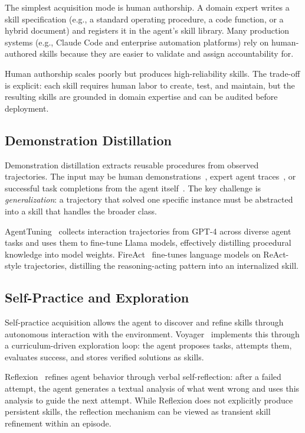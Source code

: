 \documentclass[conference, compsoc]{IEEEtran}
\theoremstyle{plain}
\begin{document}
The simplest acquisition mode is human authorship. A domain expert writes a skill specification (e.g., a standard operating procedure, a code function, or a hybrid document) and registers it in the agent's skill library. Many production systems (e.g., Claude Code and enterprise automation platforms) rely on human-authored skills because they are easier to validate and assign accountability for.

Human authorship scales poorly but produces high-reliability skills. The trade-off is explicit: each skill requires human labor to create, test, and maintain, but the resulting skills are grounded in domain expertise and can be audited before deployment.

\subsection{Demonstration Distillation}
\label{sec:acquisition:distillation}

Demonstration distillation extracts reusable procedures from observed trajectories. The input may be human demonstrations~\cite{zhang2023appagent}, expert agent traces~\cite{zeng2023agenttuning}, or successful task completions from the agent itself~\cite{wang2023voyager}. The key challenge is \emph{generalization}: a trajectory that solved one specific instance must be abstracted into a skill that handles the broader class.

AgentTuning~\cite{zeng2023agenttuning} collects interaction trajectories from GPT-4 across diverse agent tasks and uses them to fine-tune Llama models, effectively distilling procedural knowledge into model weights. FireAct~\cite{chen2023fireact} fine-tunes language models on ReAct-style trajectories, distilling the reasoning-acting pattern into an internalized skill.

\subsection{Self-Practice and Exploration}
\label{sec:acquisition:selfpractice}

Self-practice acquisition allows the agent to discover and refine skills through autonomous interaction with the environment. Voyager~\cite{wang2023voyager} implements this through a curriculum-driven exploration loop: the agent proposes tasks, attempts them, evaluates success, and stores verified solutions as skills.

Reflexion~\cite{shinn2023reflexion} refines agent behavior through verbal self-reflection: after a failed attempt, the agent generates a textual analysis of what went wrong and uses this analysis to guide the next attempt. While Reflexion does not explicitly produce persistent skills, the reflection mechanism can be viewed as transient skill refinement within an episode.
\end{document}
